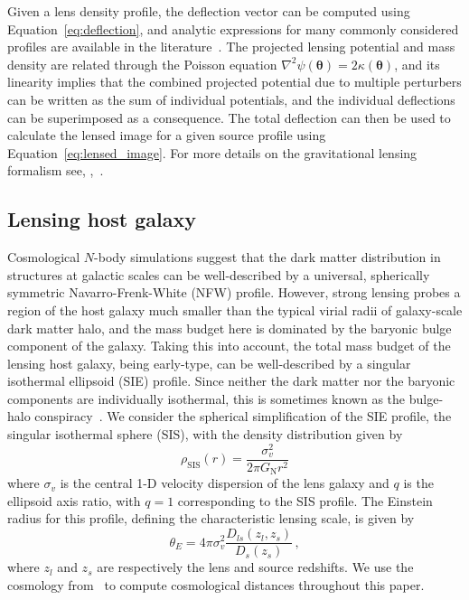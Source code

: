 \documentclass[twocolumn]{aastex63}
\begin{document}
Given a lens density profile, the deflection vector can be computed using Equation~\eqref{eq:deflection}, and analytic expressions for many commonly considered profiles are available in the literature~\citep[\eg,][]{2001astro.ph..2341K}. The projected lensing potential and mass density are related through the Poisson equation $\nabla^2 \psi(\boldsymbol{\theta}) = 2\kappa(\boldsymbol{\theta})$, and its linearity implies that the combined projected potential due to multiple perturbers can be written as the sum of individual potentials, and the individual deflections can be superimposed as a consequence. The total deflection can then be used to calculate the lensed image for a given source profile using Equation~\eqref{eq:lensed_image}. For more details on the gravitational lensing formalism see, \eg,~\citet{1992grle.book.....S,astro-ph/9912508,1003.5567}.

\subsection{Lensing host galaxy}

Cosmological $N$-body simulations suggest that the dark matter distribution in structures at galactic scales can be well-described by a universal, spherically symmetric Navarro-Frenk-White (NFW) profile. However, strong lensing probes a region of the host galaxy much smaller than the typical virial radii of galaxy-scale dark matter halo, and the mass budget here is dominated by the baryonic bulge component of the galaxy. Taking this into account, the total mass budget of the lensing host galaxy, being early-type, can be well-described by a singular isothermal ellipsoid (SIE) profile. Since neither the dark matter nor the baryonic components are individually isothermal, this is sometimes known as the bulge-halo conspiracy~\citep{1003.5567}. We consider the spherical simplification of the SIE profile, the singular isothermal sphere (SIS), with the density distribution given by~\citep{1994A&A...284..285K,1003.5567}
\begin{equation}
\rho_\mathrm{SIS}(r)=\frac{\sigma_{v}^{2}}{2 \pi G_\mathrm{N} r^2}
\label{eq:hostprofile}
\end{equation}
where $\sigma_{v}$ is the central 1-D velocity dispersion of the lens galaxy and $q$ is the ellipsoid axis ratio, with $q=1$ corresponding to the SIS profile. The Einstein radius for this profile, defining the characteristic lensing scale, is given by~\citep{1003.5567}
\begin{equation}
\theta_{{E}}=4 \pi\sigma_{v}^{2} \frac{D_{l s}\left(z_{l}, z_{s}\right)}{D_{s}\left(z_{s}\right)} \,,
\label{eq:siethetae}
\end{equation}
where $z_{l}$ and $z_{s}$ are respectively the lens and source redshifts. We use the cosmology from~\citet{1502.01589} to compute cosmological distances throughout this paper.
\end{document}
